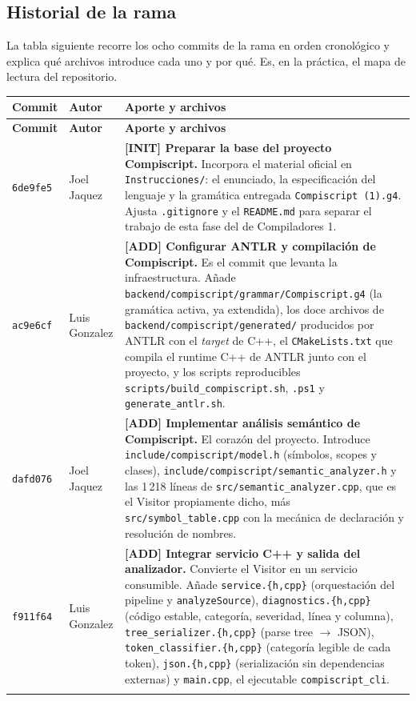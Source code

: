 \documentclass[11pt,a4paper]{article}
\begin{document}
\subsection{Historial de la rama}

La tabla siguiente recorre los ocho commits de la rama en orden cronológico y
explica qué archivos introduce cada uno y por qué. Es, en la práctica, el mapa
de lectura del repositorio.

\begin{longtable}{@{}p{1.6cm}L{2.7cm}L{9.1cm}@{}}
\toprule
\textbf{Commit} & \textbf{Autor} & \textbf{Aporte y archivos} \\
\midrule
\endfirsthead
\toprule
\textbf{Commit} & \textbf{Autor} & \textbf{Aporte y archivos} \\
\midrule
\endhead

\texttt{6de9fe5} & Joel Jaquez &
\textbf{[INIT] Preparar la base del proyecto Compiscript.} Incorpora el material
oficial en \texttt{Instrucciones/}: el enunciado, la especificación del lenguaje
y la gramática entregada \texttt{Compiscript (1).g4}. Ajusta
\texttt{.gitignore} y el \texttt{README.md} para separar el trabajo de esta fase
del de Compiladores 1. \\
\addlinespace

\texttt{ac9e6cf} & Luis Gonzalez &
\textbf{[ADD] Configurar ANTLR y compilación de Compiscript.} Es el commit que
levanta la infraestructura. Añade
\texttt{backend/compiscript/grammar/Compiscript.g4} (la gramática activa, ya
extendida), los doce archivos de
\texttt{backend/compiscript/generated/} producidos por ANTLR con el
\emph{target} de C++, el \texttt{CMakeLists.txt} que compila el runtime C++ de
ANTLR junto con el proyecto, y los scripts reproducibles
\texttt{scripts/build\_compiscript.sh}, \texttt{.ps1} y
\texttt{generate\_antlr.sh}. \\
\addlinespace

\texttt{dafd076} & Joel Jaquez &
\textbf{[ADD] Implementar análisis semántico de Compiscript.} El corazón del
proyecto. Introduce \texttt{include/compiscript/model.h} (símbolos, scopes y
clases), \texttt{include/compiscript/semantic\_analyzer.h} y las 1\,218 líneas
de \texttt{src/semantic\_analyzer.cpp}, que es el Visitor propiamente dicho,
más \texttt{src/symbol\_table.cpp} con la mecánica de declaración y resolución
de nombres. \\
\addlinespace

\texttt{f911f64} & Luis Gonzalez &
\textbf{[ADD] Integrar servicio C++ y salida del analizador.} Convierte el
Visitor en un servicio consumible. Añade \texttt{service.\{h,cpp\}}
(orquestación del pipeline y \texttt{analyzeSource}),
\texttt{diagnostics.\{h,cpp\}} (código estable, categoría, severidad, línea y
columna), \texttt{tree\_serializer.\{h,cpp\}} (parse tree $\rightarrow$ JSON),
\texttt{token\_classifier.\{h,cpp\}} (categoría legible de cada token),
\texttt{json.\{h,cpp\}} (serialización sin dependencias externas) y
\texttt{main.cpp}, el ejecutable \texttt{compiscript\_cli}. \\
\addlinespace


\end{longtable}
\end{document}
